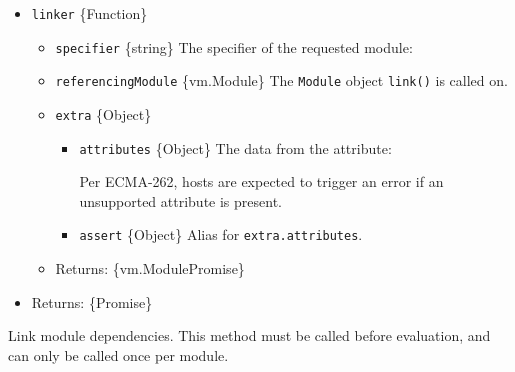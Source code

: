 \begin{itemize}
\tightlist
\item
  \texttt{linker} \{Function\}

  \begin{itemize}
  \item
    \texttt{specifier} \{string\} The specifier of the requested module:

\begin{Shaded}
\begin{Highlighting}[]
 \OperatorTok{;}
\end{Highlighting}
\end{Shaded}
  \item
    \texttt{referencingModule} \{vm.Module\} The \texttt{Module} object
    \texttt{link()} is called on.
  \item
    \texttt{extra} \{Object\}

    \begin{itemize}
    \item
      \texttt{attributes} \{Object\} The data from the attribute:

\begin{Shaded}
\begin{Highlighting}[]
  \NormalTok{ \{ }\OperatorTok{:} \NormalTok{ \}}\OperatorTok{;}
\end{Highlighting}
\end{Shaded}

      Per ECMA-262, hosts are expected to trigger an error if an
      unsupported attribute is present.
    \item
      \texttt{assert} \{Object\} Alias for \texttt{extra.attributes}.
    \end{itemize}
  \item
    Returns: \{vm.Module\textbar Promise\}
  \end{itemize}
\item
  Returns: \{Promise\}
\end{itemize}

Link module dependencies. This method must be called before evaluation,
and can only be called once per module.

